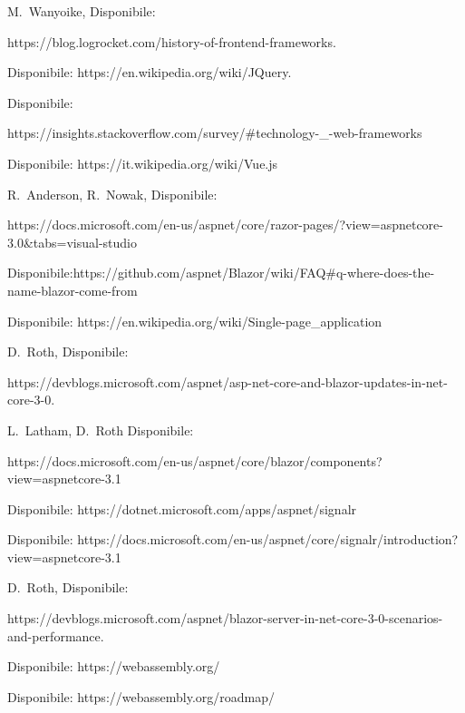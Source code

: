 \begin{thebibliography}{999}

M.~Wanyoike,
Disponibile:

https://blog.logrocket.com/history-of-frontend-frameworks.

Disponibile: https://en.wikipedia.org/wiki/JQuery.

Disponibile:

https://insights.stackoverflow.com/survey/\#technology-\_-web-frameworks

Disponibile: https://it.wikipedia.org/wiki/Vue.js

R.~Anderson,
R.~Nowak,
Disponibile:

https://docs.microsoft.com/en-us/aspnet/core/razor-pages/?view=aspnetcore-3.0\&tabs=visual-studio

Disponibile:\linebreak https://github.com/aspnet/Blazor/wiki/FAQ\linebreak\#q-where-does-the-name-blazor-come-from

Disponibile: https://en.wikipedia.org/wiki/Single-page\_application

D.~Roth,
Disponibile:

https://devblogs.microsoft.com/aspnet/asp-net-core-and-blazor-updates-in-net-core-3-0.

L.~Latham, D.~Roth
Disponibile:

https://docs.microsoft.com/en-us/aspnet/core/blazor/components\linebreak?view=aspnetcore-3.1

Disponibile: https://dotnet.microsoft.com/apps/aspnet/signalr

Disponibile:\linebreak
https://docs.microsoft.com/en-us/aspnet/core/signalr/introduction?\linebreak view=aspnetcore-3.1

D.~Roth,
Disponibile:

https://devblogs.microsoft.com/aspnet/blazor-server-in-net-core-3-0-scenarios-and-performance.

Disponibile: https://webassembly.org/

Disponibile: https://webassembly.org/roadmap/


\end{thebibliography}
